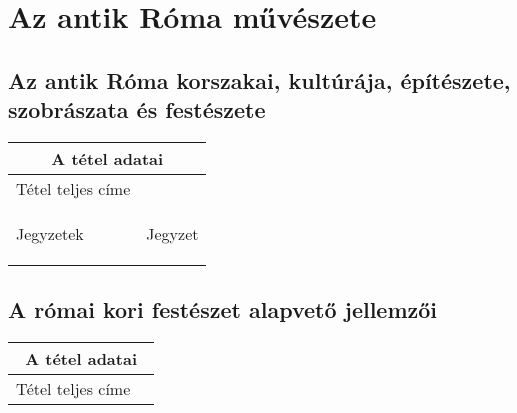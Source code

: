 \chapter{Az antik Róma művészete} %
\label{ch:3_antik_roma}

\section{Az antik Róma korszakai, kultúrája, építészete, szobrászata és festészete}

\begin{center}
	\begin{longtable}{ | p{} | p{} | }
		
		\hline
		\multicolumn{2}{|c|}{\textbf{A tétel adatai}}
		\\ \hline
		
		\hline
		Tétel teljes címe & 
		\\ \hline
		
		Jegyzetek &
		\begin{compactitem}
			\item Jegyzet
		\end{compactitem}
		\\\hline
		
	\end{longtable}
\end{center}

\cleardoublepage


\section{A római kori festészet alapvető jellemzői}

\begin{center}
	\begin{longtable}{ | p{} | p{} | }
		
		\hline
		\multicolumn{2}{|c|}{\textbf{A tétel adatai}}
		\\ \hline
		
		\hline
		Tétel teljes címe 
		&
		
		\\ \hline
		
	\end{longtable}
\end{center}